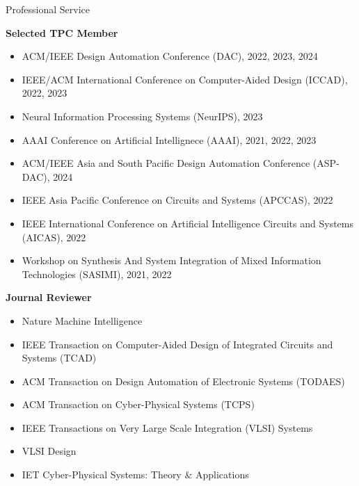
\begin{rSection}{Professional Service}

\textbf{Selected TPC Member}
\begin{itemize}
    \item ACM/IEEE Design Automation Conference (DAC), 2022, 2023, 2024
    \item IEEE/ACM International Conference on Computer-Aided Design (ICCAD), 2022, 2023
    \item Neural Information Processing Systems (NeurIPS), 2023
    \item AAAI Conference on Artificial Intellignece (AAAI), 2021, 2022, 2023
    \item ACM/IEEE Asia and South Pacific Design Automation Conference (ASP-DAC), 2024
    \item IEEE Asia Pacific Conference on Circuits and Systems (APCCAS), 2022
    \item IEEE International Conference on Artificial Intelligence Circuits and Systems (AICAS), 2022
    \item Workshop on Synthesis And System Integration of Mixed Information Technologies (SASIMI), 2021, 2022
\end{itemize}


\textbf{Journal Reviewer}
\begin{itemize}
    \item Nature Machine Intelligence
    \item IEEE Transaction on Computer-Aided Design of Integrated Circuits and Systems (TCAD)
    \item ACM Transaction on Design Automation of Electronic Systems (TODAES)
    \item ACM Transaction on Cyber-Physical Systems (TCPS)
    \item IEEE Transactions on Very Large Scale Integration (VLSI) Systems
    \item VLSI Design
    \item IET Cyber-Physical Systems: Theory \& Applications
\end{itemize}


\end{rSection}

